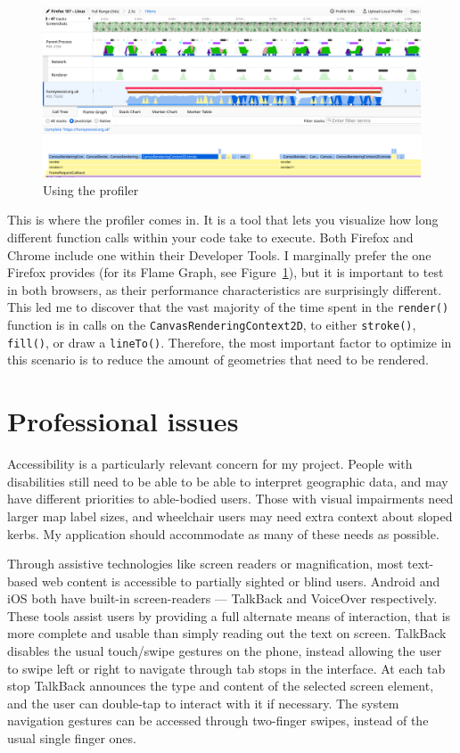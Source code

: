 \documentclass[hyphens]{final_report}
\begin{document}
\begin{figure}[ht]
    \centering
    \includegraphics[width=\textwidth]{../proof-of-concepts/4-rendering-osm-data/screenshots/profiling.png}
    \caption{Using the profiler}\label{fig:profiling}
\end{figure}

This is where the profiler comes in. It is a tool that lets you visualize how long different function calls within your code take to execute. Both Firefox and Chrome include one within their Developer Tools. I marginally prefer the one Firefox provides (for its Flame Graph, see Figure~\ref{fig:profiling}), but it is important to test in both browsers, as their performance characteristics are surprisingly different. This led me to discover that the vast majority of the time spent in the \texttt{render()} function is in calls on the \texttt{CanvasRenderingContext2D}, to either \texttt{stroke()}, \texttt{fill()}, or draw a \texttt{lineTo()}. Therefore, the most important factor to optimize in this scenario is to reduce the amount of geometries that need to be rendered.

\clearpage

\chapter{Professional issues}

Accessibility is a particularly relevant concern for my project. People with disabilities still need to be able to be able to interpret geographic data, and may have different priorities to able-bodied users. Those with visual impairments need larger map label sizes, and wheelchair users may need extra context about sloped kerbs. My application should accommodate as many of these needs as possible.

Through assistive technologies like screen readers or magnification, most text-based web content is accessible to partially sighted or blind users. Android and iOS both have built-in screen-readers --- TalkBack and VoiceOver respectively. These tools assist users by providing a full alternate means of interaction, that is more complete and usable than simply reading out the text on screen. TalkBack disables the usual touch/swipe gestures on the phone, instead allowing the user to swipe left or right to navigate through tab stops in the interface. At each tab stop TalkBack announces the type and content of the selected screen element, and the user can double-tap to interact with it if necessary. The system navigation gestures can be accessed through two-finger swipes, instead of the usual single finger ones.
\end{document}
